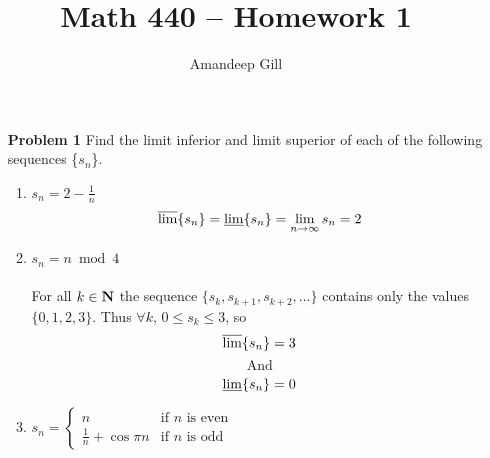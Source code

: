 \documentclass[a4paper,12pt]{article}
\begin{document}
\title{Math 440 -- Homework 1}
\author{Amandeep Gill}
\maketitle

\begin{enumerate}

\item[\bf{Problem 1}] Find the limit inferior and limit superior of each of the following sequences \{$s_n$\}. 
	\begin{enumerate}
	\item{$s_n = 2 - \frac{1}{n}$} \\
		\[\varlimsup \{s_n\} = \varliminf \{s_n\} = \lim\limits_{n \to \infty}{s_n} = 2\]

	\item{$s_n = n \bmod{4}$} \\\\
		For all $k \in \bf{N}$ the sequence $\{s_k, s_{k+1}, s_{k+2}, \ldots\}$ contains only the values $\{0, 1, 2, 3\}$. Thus $\forall{k}$, $0 \leqslant s_k \leqslant 3$, so
		\[\varlimsup \{s_n\} = 3 \]
		\[\text{And}\]
		\[\varliminf \{s_n\} = 0 \] 

	\item{$s_n = \begin{cases}
		n & \text{if $n$ is even} \\
		\frac{1}{n} + \cos{\pi n} & \text{if $n$ is odd}
		\end{cases}$}
		
		
		
	\end{enumerate}


\end{enumerate}
\end{document}
